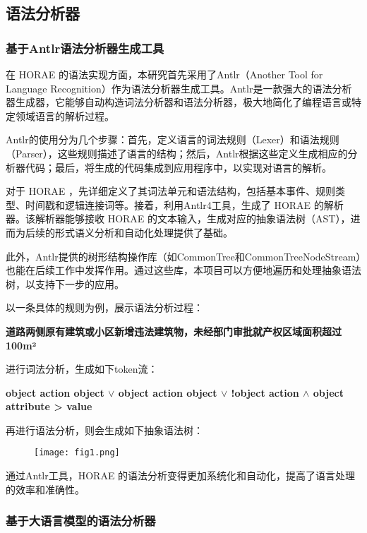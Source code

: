 \subsection{语法分析器}

\subsubsection{基于Antlr语法分析器生成工具}

在 HORAE 的语法实现方面，本研究首先采用了Antlr（Another Tool for Language Recognition）作为语法分析器生成工具。Antlr是一款强大的语法分析器生成器，它能够自动构造词法分析器和语法分析器，极大地简化了编程语言或特定领域语言的解析过程。

Antlr的使用分为几个步骤：首先，定义语言的词法规则（Lexer）和语法规则（Parser），这些规则描述了语言的结构；然后，Antlr根据这些定义生成相应的分析器代码；最后，将生成的代码集成到应用程序中，以实现对语言的解析。

对于 HORAE ，先详细定义了其词法单元和语法结构，包括基本事件、规则类型、时间戳和逻辑连接词等。接着，利用Antlr4工具，生成了 HORAE 的解析器。该解析器能够接收 HORAE 的文本输入，生成对应的抽象语法树（AST），进而为后续的形式语义分析和自动化处理提供了基础。

此外，Antlr提供的树形结构操作库（如CommonTree和CommonTreeNodeStream）也能在后续工作中发挥作用。通过这些库，本项目可以方便地遍历和处理抽象语法树，以支持下一步的应用。

以一条具体的规则为例，展示语法分析过程：

\noindent\textbf{道路两侧原有建筑或小区新增违法建筑物，未经部门审批就产权区域面积超过100m²}

进行词法分析，生成如下token流：

\noindent\textbf{object action object $\lor$ object action object $\lor$ !object action $\land$ object attribute > value}


再进行语法分析，则会生成如下抽象语法树：

\begin{figure}[ht]
    \centering
    \texttt{[image: fig1.png]}
\end{figure}

通过Antlr工具，HORAE 的语法分析变得更加系统化和自动化，提高了语言处理的效率和准确性。

\subsubsection{基于大语言模型的语法分析器}

